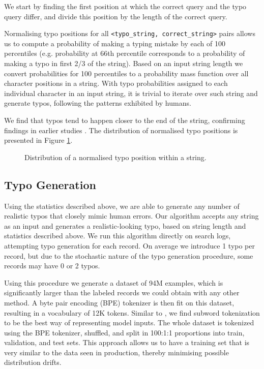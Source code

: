 \documentclass[11pt,a4paper]{article}
\begin{document}
We start by finding the first position at which the correct query and the typo query differ, and divide this position by the length of the correct query.

Normalising typo positions for all \texttt{<typo\_string, correct\_string>} pairs allows us to compute a probability of making a typing mistake by each of 100 percentiles (e.g. probability at 66th percentile corresponds to a probability of making a typo in first 2/3 of the string). Based on an input string length we convert probabilities for 100 percentiles to a probability mass function over all character positions in a string. With typo probabilities assigned to each individual character in an input string, it is trivial to iterate over such string and generate typos, following the patterns exhibited by humans.

We find that typos tend to happen closer to the end of the string, confirming findings in earlier studies \cite{en_spelling}. The distribution of normalised typo positions is presented in Figure \ref{fig:string_pos_dist}.

\begin{figure}[htbp]
\caption{Distribution of a normalised typo position within a string.}
\label{fig:string_pos_dist}
\end{figure}

\subsection{Typo Generation\label{sec:typo_generation}}
Using the statistics described above, we are able to generate any number of realistic typos that closely mimic human errors. Our algorithm accepts any string as an input and generates a realistic-looking typo, based on string length and statistics described above. We run this algorithm directly on search logs, attempting typo generation for each record. On average we introduce 1 typo per record, but due to the stochastic nature of the typo generation procedure, some records may have 0 or 2 typos.

Using this procedure we generate a dataset of 94M examples, which is significantly larger than the labeled records we could obtain with any other method. A byte pair encoding (BPE) tokenizer \cite{sennrich2015neural} is then fit on this dataset, resulting in a vocabulary of 12K tokens. Similar to , we find subword tokenization to be the best way of representing model inputs. The whole dataset is tokenized using the BPE tokenizer, shuffled, and split in 100:1:1 proportions into train, validation, and test sets. This approach allows us to have a training set that is very similar to the data seen in production, thereby minimising possible distribution drifts.
\end{document}
